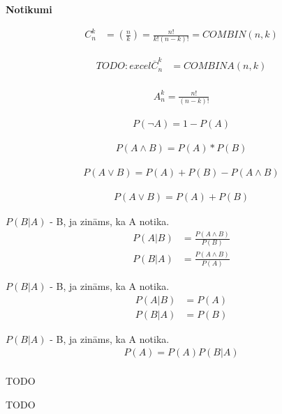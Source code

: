 \linebreak
\textbf{Notikumi}

{\begin{align*}
    C_n^k &= (\frac{n}{k}) = \frac{n!}{k!(n-k)!} = COMBIN(n, k)
\end{align*}}

{\begin{align*}
    TODO: excel
    \overline{C}_n^k &= COMBINA(n, k) \\
\end{align*}}

{\begin{align*}
    A_n^k = \frac{n!}{(n-k)!}
\end{align*}}

{\begin{align*}
    P(\lnot A ) = 1 - P (A)
\end{align*}}

{\begin{align*}
    P(A \land B) = P(A) * P(B)
\end{align*}}

{\begin{align*}
    P(A \lor B) = P(A) + P(B) - P(A \land B)
\end{align*}}

{\begin{align*}
    P(A \lor B) = P(A) + P(B)
\end{align*}}


{

    $P(B|A)$ - B, ja zināms, ka A notika.
    \begin{align*}
        P(A|B) &= \displaystyle\frac{P(A \land B)}{P(B)} \\
        P(B|A) &= \displaystyle\frac{P(A \land B)}{P(A)}
    \end{align*}
}



{

    $P(B|A)$ - B, ja zināms, ka A notika.
    \begin{align*}
        P(A|B) &= P(A) \\ 
        P(B|A) &= P(B) 
    \end{align*}
}



{

    $P(B|A)$ - B, ja zināms, ka A notika.
    \begin{align*}
        P(A) = P(A)P(B|A) \\
    \end{align*}
}



{
   TODO 
}


{

    TODO 
}
